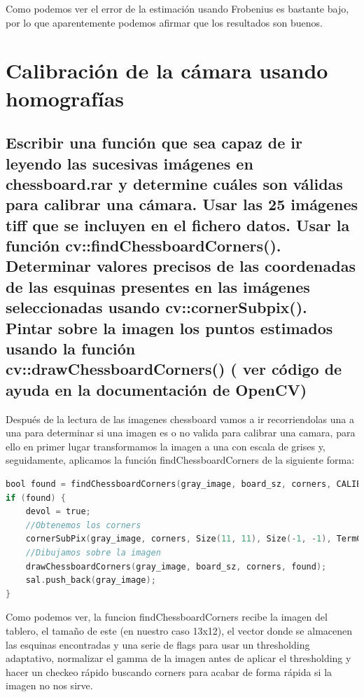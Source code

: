 Como podemos ver el error de la estimación usando Frobenius es bastante bajo, por lo que aparentemente podemos afirmar que los resultados son buenos.



\section{Calibración de la cámara usando homografías }

\subsection{Escribir una función que sea capaz de ir leyendo las sucesivas imágenes en chessboard.rar y determine cuáles son válidas para calibrar una cámara. Usar las 25 imágenes tiff que se incluyen en el fichero datos. Usar la función cv::findChessboardCorners(). Determinar valores precisos de las coordenadas de las esquinas presentes en las imágenes seleccionadas usando cv::cornerSubpix(). Pintar sobre la imagen los puntos estimados usando la función cv::drawChessboardCorners() ( ver código de ayuda en la documentación de OpenCV)}

Después de la lectura de las imagenes chessboard vamos a ir recorriendolas una a una para determinar si una imagen es o no valida para calibrar una camara, para ello en primer lugar transformamos la imagen a una con escala de grises y, seguidamente, aplicamos la función findChessboardCorners de la siguiente forma:\\

\begin{lstlisting}[language=C]
bool found = findChessboardCorners(gray_image, board_sz, corners, CALIB_CB_ADAPTIVE_THRESH + CALIB_CB_NORMALIZE_IMAGE + CALIB_CB_FAST_CHECK);
if (found) {
	devol = true;
	//Obtenemos los corners
	cornerSubPix(gray_image, corners, Size(11, 11), Size(-1, -1), TermCriteria(CV_TERMCRIT_EPS + CV_TERMCRIT_ITER, 30, 0.1));
	//Dibujamos sobre la imagen
	drawChessboardCorners(gray_image, board_sz, corners, found);
	sal.push_back(gray_image);
}
\end{lstlisting}

Como podemos ver, la funcion findChessboardCorners recibe  la imagen del tablero, el tamaño de este (en nuestro caso 13x12), el vector donde se almacenen las esquinas encontradas y una serie de flags para usar un thresholding adaptativo, normalizar el gamma de la imagen antes de aplicar el thresholding y hacer un checkeo rápido buscando corners para acabar de forma rápida si la imagen no nos sirve.\\

